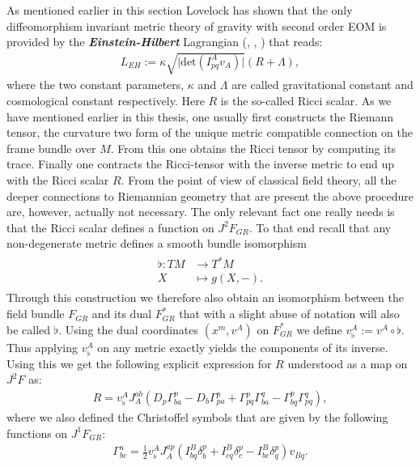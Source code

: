 \documentclass[a4paper,12pt, DIV=14, BCOR=5mm, twoside, headsepline, numbers=noenddot]{scrbook}
\begin{document}
As mentioned earlier in this section Lovelock has shown that the only diffeomorphism invariant metric theory of gravity with second order EOM is provided by the \textit{\textbf{Einstein-Hilbert}} Lagrangian (\cite{Lovelock1969}, \cite{doi:10.1063/1.1665613}, \cite{doi:10.1063/1.1666069}) that reads:
\begin{align}
    L_{EH} := \kappa \sqrt{\vert \mathrm{det} \left ( I^A_{pq}v_A \right ) \vert }  \left( R + \Lambda \right ),
\end{align}
where the two constant parameters, $\kappa$ and $\Lambda$ are called gravitational constant and cosmological constant respectively. Here $R$ is the so-called Ricci scalar. As we have mentioned earlier in this thesis, one usually first constructs the Riemann tensor, the curvature two form of the unique metric compatible connection on the frame bundle over $M$. From this one obtains the Ricci tensor by computing its trace. Finally one contracts the Ricci-tensor with the inverse metric to end up with the Ricci scalar $R$. From the point of view of classical field theory, all the deeper connections to Riemannian geometry that are present the above procedure are, however, actually not necessary. The only relevant fact one really needs is that the Ricci scalar defines a function on $J^2F_{GR}$. To that end recall that any non-degenerate metric defines a smooth bundle isomorphism 
\begin{align}\label{music}
\begin{aligned}
\flat : TM &\longrightarrow T^{\ast}M\\
X &\longmapsto g(X,-) .
\end{aligned}
\end{align}
Through this construction we therefore also obtain an isomorphism between the field bundle $F_{GR}$ and its dual $F_{GR}^{\ast}$ that with a slight abuse of notation will also be called $\flat$. 
Using the dual coordinates $(x^m,v^A)$ on $F_{GR}^{\ast}$ we define $v^A_{\flat} := v^A \circ \flat$. Thus applying $v^A_{\flat}$ on any metric exactly yields the components of its inverse. Using this we get the following explicit expression for $R$ understood as a map on $J^2F$ as:
\begin{align}
R = v_{\flat}^A J_A^{ab} \left ( D_p \Gamma^p_{ba} - D_b \Gamma^p_{pa} + \Gamma^p_{pq} \Gamma^q_{ba} - \Gamma^p_{bq} \Gamma^q_{pq} \right ),
\end{align}
where we also defined the Christoffel symbols that are given by the following functions on $J^1F_{GR}$:
\begin{align}
\Gamma^a_{bc} = \frac{1}{2} v_{\flat}^A J_A^{ap} \left ( I^B_{bq}\delta^p_b + I^B_{cq}\delta^p_c - I^B_{bc}\delta^p_q  \right ) v_{Bq}.
\end{align}
\end{document}
